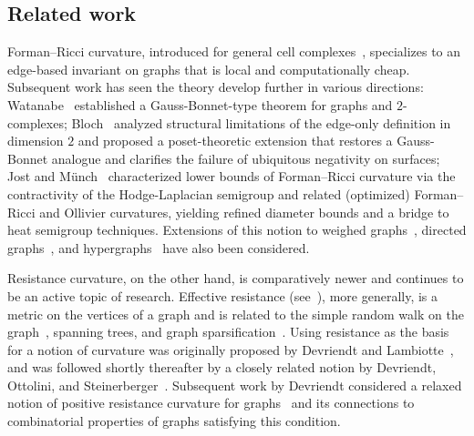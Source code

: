 \documentclass[11pt,a4paper]{amsart}
\begin{document}
\subsection{Related work}

Forman--Ricci curvature, introduced for general cell complexes~\cite{forman}, specializes to an edge-based invariant on graphs that is local and computationally cheap. Subsequent work has seen the theory develop further in various directions: Watanabe~\cite{Watanabe2019} established a Gauss-Bonnet-type theorem for graphs and $2$-complexes; Bloch~\cite{Bloch2014} analyzed structural limitations of the edge-only definition in dimension $2$ and proposed a poset-theoretic extension that restores a Gauss-Bonnet analogue and clarifies the failure of ubiquitous negativity on surfaces; Jost and M{\"u}nch~\cite{JostMuench2021} characterized lower bounds of Forman--Ricci curvature via the contractivity of the Hodge-Laplacian semigroup and related (optimized) 
Forman--Ricci and Ollivier curvatures, yielding refined diameter bounds and a bridge to heat semigroup techniques. Extensions of this notion to weighed graphs~\cite{Sreejith2016}, directed graphs~\cite{Sreejith2016}, and hypergraphs~\cite{Leal2021Hypergraph} have also been considered.

Resistance curvature, on the other hand, is comparatively newer and continues 
to be an active topic of research. Effective resistance (see~\cite{KleinRandic1993ResistanceDistance}), more generally, is a metric on the vertices of a graph and is related to the simple random walk on the graph~\cite{Tetali1991RandomWalksResistance,DoyleSnell1984RWEN}, spanning trees, and graph sparsification~\cite{SpielmanSrivastava2011Sparsification}. Using resistance as the basis for a notion of curvature was originally proposed by Devriendt and Lambiotte~\cite{DL}, and was followed shortly thereafter by a closely related notion by Devriendt, Ottolini, and Steinerberger~\cite{devriendt2024graph}. Subsequent work by Devriendt considered a relaxed notion of positive resistance curvature for graphs~\cite{devriendt2025graphs} and its connections to combinatorial properties of graphs satisfying this condition.
\end{document}
